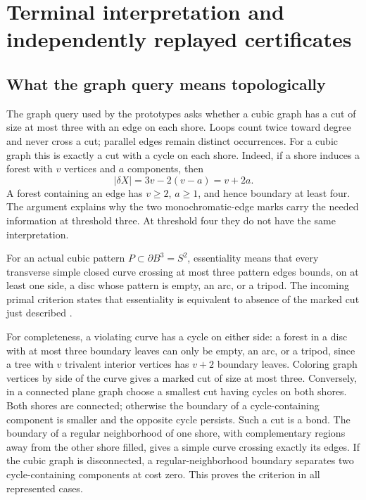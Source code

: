 \section{Terminal interpretation and independently replayed certificates}
\label{sec:terminal-certification}

\subsection{What the graph query means topologically}

The graph query used by the prototypes asks whether a cubic graph has a cut
of size at most three with an edge on each shore. Loops count twice toward
degree and never cross a cut; parallel edges remain distinct occurrences.
For a cubic graph this is exactly a cut with a cycle on each shore. Indeed,
if a shore induces a forest with $v$ vertices and $a$ components, then
\[
 |\delta X|=3v-2(v-a)=v+2a.
\]
A forest containing an edge has $v\geq2$, $a\geq1$, and hence boundary at
least four. The argument explains why the two monochromatic-edge marks carry
the needed information at threshold three. At threshold four they do not
have the same interpretation.

For an actual cubic pattern $P\subset\partial B^3=S^2$, essentiality means
that every transverse simple closed curve crossing at most three pattern
edges bounds, on at least one side, a disc whose pattern is empty, an arc,
or a tripod. The incoming primal criterion states that essentiality is
equivalent to absence of the marked cut just described
\cite{incoming-four-copy,lackenby2026}.

For completeness, a violating curve has a cycle on either side: a forest in
a disc with at most three boundary leaves can only be empty, an arc, or a
tripod, since a tree with $v$ trivalent interior vertices has $v+2$ boundary
leaves. Coloring graph vertices by side of the curve gives a marked cut of
size at most three. Conversely, in a connected plane graph choose a smallest
cut having cycles on both shores. Both shores are connected; otherwise the
boundary of a cycle-containing component is smaller and the opposite cycle
persists. Such a cut is a bond. The boundary of a regular neighborhood of
one shore, with complementary regions away from the other shore filled,
gives a simple curve crossing exactly its edges. If the cubic graph is
disconnected, a regular-neighborhood boundary separates two cycle-containing
components at cost zero. This proves the criterion in all represented cases.

